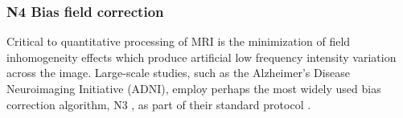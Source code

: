 %


\subsubsection{N4 Bias field correction}

Critical to quantitative processing of MRI is the minimization of
field inhomogeneity effects which produce artificial low frequency 
intensity variation across the image.  Large-scale studies, such
as the Alzheimer's Disease Neuroimaging Initiative (ADNI), employ
perhaps the most widely used bias correction algorithm, N3 \citep{sled1998}, 
as part of their standard protocol \citep{boyes2008}.

